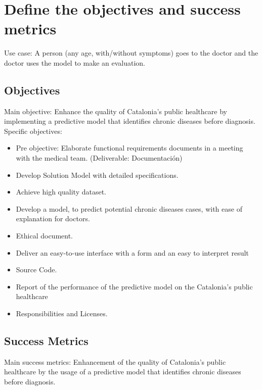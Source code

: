 \section{Define the objectives and success metrics}\label{sec:define-the-objectives-and-success-metrics}

Use case: A person (any age, with/without symptoms) goes to the doctor and the doctor uses the model to make an evaluation.

\subsection{Objectives}\label{subsec:objectives}
Main objective: Enhance the quality of Catalonia’s public healthcare by implementing a predictive model that identifies chronic diseases before diagnosis. \\

Specific objectives:

\begin{itemize}
    \item Pre objective: Elaborate functional requirements documents in a meeting with the medical team. (Deliverable: Documentación)
    \item Develop Solution Model with detailed specifications.
    \item Achieve high quality dataset.
    \item Develop a model, to predict potential chronic diseases cases, with ease of explanation for doctors.
    \item Ethical document.
    \item Deliver an easy-to-use interface with a form and an easy to interpret result
    \item Source Code.
    \item Report of the performance of the predictive model on the Catalonia’s public healthcare
    \item Responsibilities and Licenses.

\end{itemize}

\subsection{Success Metrics}\label{subsec:success-metrics}
Main success metrics: Enhancement of the quality of Catalonia’s public healthcare by the usage of a predictive model that identifies chronic diseases before diagnosis. \\

